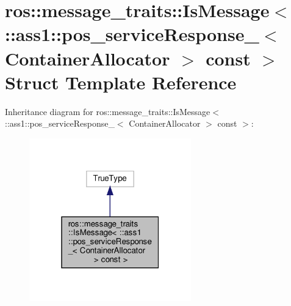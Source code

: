 \hypertarget{structros_1_1message__traits_1_1IsMessage_3_01_1_1ass1_1_1pos__serviceResponse___3_01ContainerAllocator_01_4_01const_01_4}{}\section{ros\+:\+:message\+\_\+traits\+:\+:Is\+Message$<$ \+:\+:ass1\+:\+:pos\+\_\+service\+Response\+\_\+$<$ Container\+Allocator $>$ const $>$ Struct Template Reference}
\label{structros_1_1message__traits_1_1IsMessage_3_01_1_1ass1_1_1pos__serviceResponse___3_01ContainerAllocator_01_4_01const_01_4}


Inheritance diagram for ros\+:\+:message\+\_\+traits\+:\+:Is\+Message$<$ \+:\+:ass1\+:\+:pos\+\_\+service\+Response\+\_\+$<$ Container\+Allocator $>$ const $>$\+:
\nopagebreak
\begin{figure}[H]
\begin{center}
\leavevmode
\includegraphics[width=199pt]{structros_1_1message__traits_1_1IsMessage_3_01_1_1ass1_1_1pos__serviceResponse___3_01ContainerAlfb61778442d1c53fe2d71e4d627d8d4b}
\end{center}
\end{figure}


